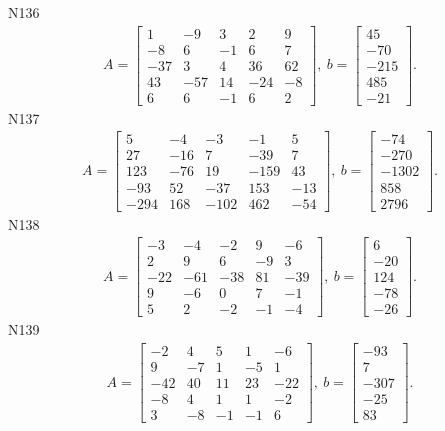 \documentclass[11pt]{report}
\begin{document}
N136
\begin{align*}
 A = \left[\begin{matrix}1 & -9 & 3 & 2 & 9\\-8 & 6 & -1 & 6 & 7\\-37 & 3 & 4 & 36 & 62\\43 & -57 & 14 & -24 & -8\\6 & 6 & -1 & 6 & 2\end{matrix}\right],
\ b = \left[\begin{matrix}45\\-70\\-215\\485\\-21\end{matrix}\right]. 
 \end{align*}
N137
\begin{align*}
 A = \left[\begin{matrix}5 & -4 & -3 & -1 & 5\\27 & -16 & 7 & -39 & 7\\123 & -76 & 19 & -159 & 43\\-93 & 52 & -37 & 153 & -13\\-294 & 168 & -102 & 462 & -54\end{matrix}\right],
\ b = \left[\begin{matrix}-74\\-270\\-1302\\858\\2796\end{matrix}\right]. 
 \end{align*}
N138
\begin{align*}
 A = \left[\begin{matrix}-3 & -4 & -2 & 9 & -6\\2 & 9 & 6 & -9 & 3\\-22 & -61 & -38 & 81 & -39\\9 & -6 & 0 & 7 & -1\\5 & 2 & -2 & -1 & -4\end{matrix}\right],
\ b = \left[\begin{matrix}6\\-20\\124\\-78\\-26\end{matrix}\right]. 
 \end{align*}
N139
\begin{align*}
 A = \left[\begin{matrix}-2 & 4 & 5 & 1 & -6\\9 & -7 & 1 & -5 & 1\\-42 & 40 & 11 & 23 & -22\\-8 & 4 & 1 & 1 & -2\\3 & -8 & -1 & -1 & 6\end{matrix}\right],
\ b = \left[\begin{matrix}-93\\7\\-307\\-25\\83\end{matrix}\right]. 
 \end{align*}
\end{document}
